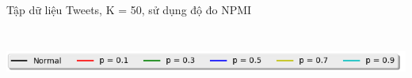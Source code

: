 \documentclass[pdf]{beamer}
\begin{document}
\begin{frame}{Tập dữ liệu Tweets, K = 50, sử dụng độ đo NPMI }
\begin{columns}[T] %
\begin{column}{.50\textwidth}
	\begin{figure}
	\end{figure}
\end{column} %
\hfill%
\begin{column}{.50\textwidth}
	\begin{figure}
	\end{figure}				
\end{column} %
\end{columns}
\begin{center}
\includegraphics[width=1\textwidth]{menu.png}	
\end{center}
\end{frame}
\end{document}
